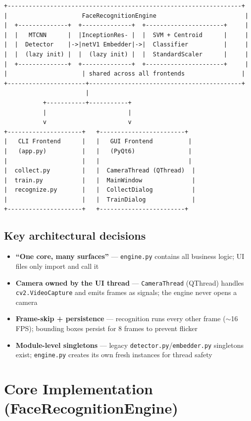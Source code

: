 \documentclass[12pt,a4paper]{article}
\begin{document}
\begin{verbatim}
+------------------------------------------------------------------+
|                     FaceRecognitionEngine                         |
|  +--------------+  +--------------+  +----------------------+     |
|  |   MTCNN      |  |InceptionRes- |  |  SVM + Centroid      |     |
|  |  Detector    |->|netV1 Embedder|->|  Classifier          |     |
|  |  (lazy init) |  |  (lazy init) |  |  StandardScaler      |     |
|  +--------------+  +--------------+  +----------------------+     |
|                     | shared across all frontends                |
+----------------------+-------------------------------------------+
                       |
           +-----------+-----------+
           |                       |
           v                       v
+---------------------+   +------------------------+
|   CLI Frontend      |   |   GUI Frontend          |
|   (app.py)          |   |   (PyQt6)               |
|                     |   |                         |
|  collect.py         |   |  CameraThread (QThread)  |
|  train.py           |   |  MainWindow              |
|  recognize.py       |   |  CollectDialog           |
|                     |   |  TrainDialog             |
+---------------------+   +------------------------+
\end{verbatim}

\subsection*{Key architectural decisions}
\begin{itemize}
    \item \textbf{``One core, many surfaces''} --- \texttt{engine.py} contains all business logic; UI files only import and call it
    \item \textbf{Camera owned by the UI thread} --- \texttt{CameraThread} (QThread) handles \texttt{cv2.VideoCapture} and emits frames as signals; the engine never opens a camera
    \item \textbf{Frame-skip + persistence} --- recognition runs every other frame ($\sim$16 FPS); bounding boxes persist for 8 frames to prevent flicker
    \item \textbf{Module-level singletons} --- legacy \texttt{detector.py}/\texttt{embedder.py} singletons exist; \texttt{engine.py} creates its own fresh instances for thread safety
\end{itemize}

\section{Core Implementation (FaceRecognitionEngine)}
\end{document}
